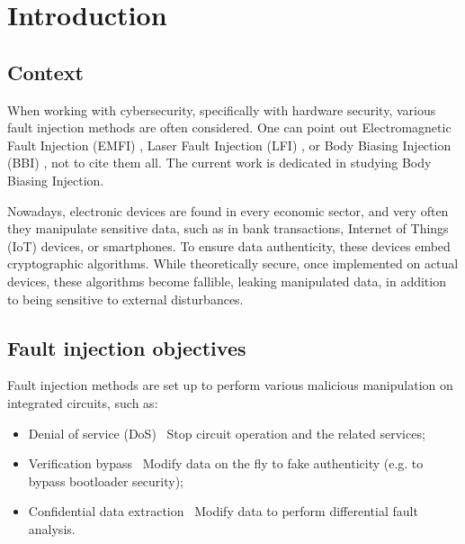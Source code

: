 
\section{Introduction}

	\subsection{Context}
		When working with cybersecurity, specifically with hardware security, various fault injection methods are often considered.
		One can point out Electromagnetic Fault Injection (EMFI) \cite{mathieuEMFI}, Laser Fault Injection (LFI) \cite{lfiFaultModel}, or Body Biasing Injection (BBI) \cite{bbiOrigin}, not to cite them all.
		The current work is dedicated in studying Body Biasing Injection.

		Nowadays, electronic devices are found in every economic sector, and very often they manipulate sensitive data, such as in bank transactions, Internet of Things (IoT) devices, or smartphones.
		To ensure data authenticity, these devices embed cryptographic algorithms.
		While theoretically secure, once implemented on actual devices, these algorithms become fallible, leaking manipulated data, in addition to being sensitive to external disturbances.

	\subsection{Fault injection objectives}
		Fault injection methods are set up to perform various malicious manipulation on integrated circuits, such as:
		\begin{itemize}
			\item Denial of service (DoS) \textrightarrow\ Stop circuit operation and the related services;
			\item Verification bypass \textrightarrow\ Modify data on the fly to fake authenticity (e.g. to bypass bootloader security);
			\item Confidential data extraction \textrightarrow\ Modify data to perform differential fault analysis.
		\end{itemize}

